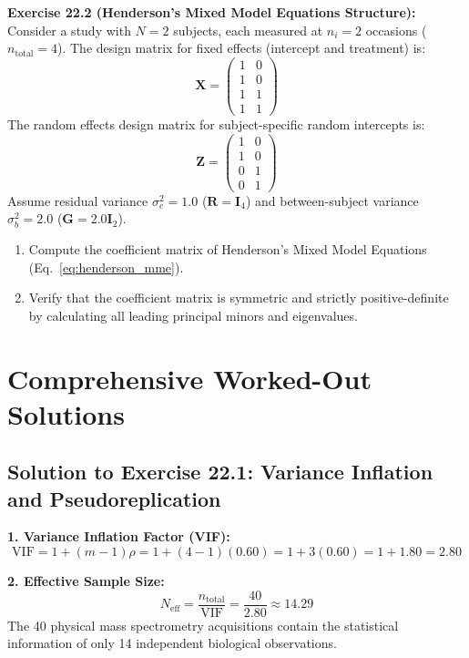 \documentclass[11pt,twoside,openright]{book}
\begin{document}
\vspace{0.8em}
\noindent
\textbf{Exercise 22.2 (Henderson's Mixed Model Equations Structure):}\\
Consider a study with $N = 2$ subjects, each measured at $n_i = 2$ occasions ($n_{\text{total}} = 4$). The design matrix for fixed effects (intercept and treatment) is:
$$\mathbf{X} = \begin{pmatrix} 1 & 0 \\ 1 & 0 \\ 1 & 1 \\ 1 & 1 \end{pmatrix}$$
The random effects design matrix for subject-specific random intercepts is:
$$\mathbf{Z} = \begin{pmatrix} 1 & 0 \\ 1 & 0 \\ 0 & 1 \\ 0 & 1 \end{pmatrix}$$
Assume residual variance $\sigma_e^2 = 1.0$ ($\mathbf{R} = \mathbf{I}_4$) and between-subject variance $\sigma_b^2 = 2.0$ ($\mathbf{G} = 2.0 \mathbf{I}_2$).
\begin{enumerate}
    \item Compute the coefficient matrix of Henderson's Mixed Model Equations (Eq.~\ref{eq:henderson_mme}).
    \item Verify that the coefficient matrix is symmetric and strictly positive-definite by calculating all leading principal minors and eigenvalues.
\end{enumerate}

\section{Comprehensive Worked-Out Solutions}

\subsection*{Solution to Exercise 22.1: Variance Inflation and Pseudoreplication}

\textbf{1. Variance Inflation Factor (VIF):}\\
$$\text{VIF} = 1 + (m - 1)\rho = 1 + (4 - 1)(0.60) = 1 + 3(0.60) = 1 + 1.80 = 2.80$$

\textbf{2. Effective Sample Size:}\\
$$N_{\text{eff}} = \frac{n_{\text{total}}}{\text{VIF}} = \frac{40}{2.80} \approx 14.29$$
The 40 physical mass spectrometry acquisitions contain the statistical information of only 14 independent biological observations.
\end{document}
